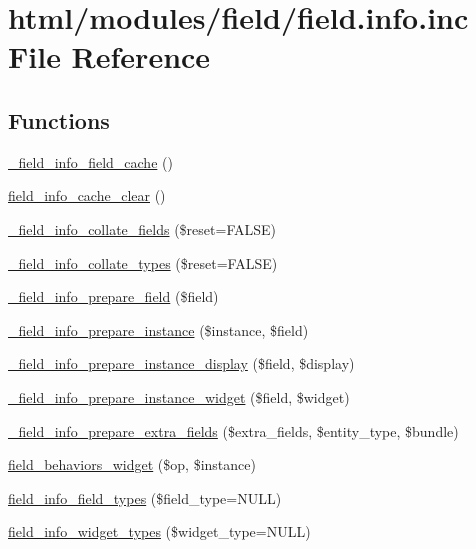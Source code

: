 \hypertarget{field_8info_8inc}{
\section{html/modules/field/field.info.inc File Reference}
\label{field_8info_8inc}
}
\subsection*{Functions}
\begin{DoxyCompactItemize}
\item 
\hyperlink{field_8info_8inc_ac916c03792bed928c8850585fbc0f433}{\_\-field\_\-info\_\-field\_\-cache} ()
\item 
\hyperlink{group__field__info_ga40cf38b714f91269818e2e65c860c794}{field\_\-info\_\-cache\_\-clear} ()
\item 
\hyperlink{group__field__info_gaf30341049660e58d46d0e132b88808b1}{\_\-field\_\-info\_\-collate\_\-fields} (\$reset=FALSE)
\item 
\hyperlink{group__field__info_gaa67e86dc65fe20e4669170ee665cfae4}{\_\-field\_\-info\_\-collate\_\-types} (\$reset=FALSE)
\item 
\hyperlink{group__field__info_ga05abfb7bf7b8a44e2a74bba47f15004f}{\_\-field\_\-info\_\-prepare\_\-field} (\$field)
\item 
\hyperlink{group__field__info_ga8518b847132ddca82db418e588cdb88a}{\_\-field\_\-info\_\-prepare\_\-instance} (\$instance, \$field)
\item 
\hyperlink{group__field__info_ga046dc640188fb6a51b904ce74e3194d0}{\_\-field\_\-info\_\-prepare\_\-instance\_\-display} (\$field, \$display)
\item 
\hyperlink{group__field__info_gab26a944e3e07f9a9e4c65ab46b89e2f3}{\_\-field\_\-info\_\-prepare\_\-instance\_\-widget} (\$field, \$widget)
\item 
\hyperlink{group__field__info_ga27575a75b302b0b030e021346c71e857}{\_\-field\_\-info\_\-prepare\_\-extra\_\-fields} (\$extra\_\-fields, \$entity\_\-type, \$bundle)
\item 
\hyperlink{group__field__info_ga5a67471e2842a7ab75ed3d03f645cf5a}{field\_\-behaviors\_\-widget} (\$op, \$instance)
\item 
\hyperlink{group__field__info_ga7f5100daee334d9f76952cb49d7d3613}{field\_\-info\_\-field\_\-types} (\$field\_\-type=NULL)
\item 
\hyperlink{group__field__info_gac0e6e70677c9e7901a2064f5bfb1dce8}{field\_\-info\_\-widget\_\-types} (\$widget\_\-type=NULL)

\end{DoxyCompactItemize}
